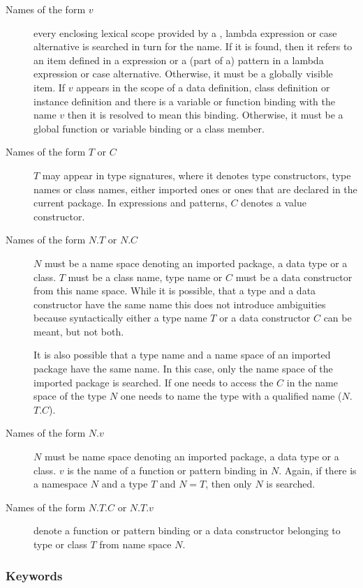 \begin{description}
\item [Names of the form $v$] every enclosing lexical scope provided by a , lambda expression or case alternative is searched in turn for the name.  If it is found, then it refers to an item defined in a  expression or a (part of a) pattern in a lambda expression or case alternative. Otherwise, it must be a globally visible item. If $v$ appears in the scope of a data definition, class definition or instance definition and there is a variable or function binding with the name $v$ then it is resolved to mean this binding. Otherwise, it must be a global function or variable binding or a class member.
\item [Names of the form $T$ or $C$] $T$ may appear in type signatures, where it denotes type constructors, type names or class names, either imported ones or ones that are declared in the current package. In expressions and patterns, $C$ denotes a value constructor.
\item[Names of the form $N$.$T$ or $N$.$C$] $N$ must be a name space denoting an imported package, a data type or a class. $T$ must be a class name, type name or $C$ must be a data constructor from this name space. While it is possible, that a type and a data constructor have the same name this does not introduce ambiguities because syntactically either a type name $T$ or a data constructor $C$ can be meant, but not both.

It is also possible that a type name and a name space of an imported package have the same name. In this case, only the name space of the imported package is searched. If one needs to access the $C$ in the name space of the type $N$ one needs to name the type with a qualified name ($N$.$T$.$C$).
\item[Names of the form $N$.$v$]
$N$ must be name space denoting an imported package, a data type or a class.
$v$ is the name of a function or pattern binding in $N$. Again, if there is a namespace $N$ and a type $T$ and $N = T$, then only $N$ is searched.
\item[Names of the form $N$.$T$.$C$ or $N$.$T$.$v$] denote a function or pattern binding or a data constructor belonging to type or class $T$ from name space $N$.
\end{description}

\subsubsection{Keywords}

